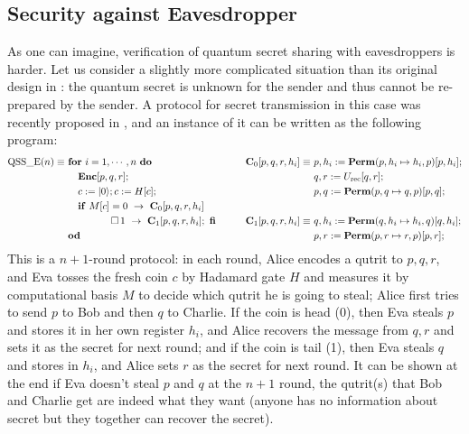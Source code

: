 \documentclass[conference,compsoc, 10pt]{IEEEtran}
\newcommand {\prog } {{\mathbf{C}}}
\def\>{\ensuremath{\rangle}}
\newcommand {\perm} {\mathbf{Perm}}
\begin{document}
\begin{appendices}
		\subsection{Security against Eavesdropper} As one can imagine, verification of quantum secret sharing with eavesdroppers is harder. Let us consider a slightly more complicated situation than its original design in \cite{HBB99,KKI99,CGL99}: the quantum secret is unknown for the sender and thus cannot be re-prepared by the sender. A protocol for secret transmission in this case was recently proposed in \cite{YLZ19}, and an instance of it can be written as the following program:  
		\begin{align*}
		{\rm QSS\_ E}(n) \equiv\ &{\bf for}\ i=1,\cdots, n\ {\bf do} & \prog_0[p,q,r,h_i]\equiv\ & p,h_i := \perm(p,h_i\mapsto h_i,p)[p,h_i];\\
		&\quad {\bf Enc}[p,q,r]; & & q,r := U_{\rm rec}[q,r];\\
		&\quad c:= |0\>; c:= H[c]; & & p,q := \perm(p,q\mapsto q,p)[p,q];\\
		&\quad {\bf if}\ M[c] = 0\ \rightarrow\ \prog_0[p,q,r,h_i] & & \\
		&\quad \qquad\quad\ \square\,  1\ \rightarrow\ \prog_1[p,q,r,h_i];\ {\bf fi} & \qquad\prog_1[p,q,r,h_i]\equiv\ & q,h_i := \perm(q,h_i\mapsto h_i,q)[q,h_i];  \\
		&{\bf od} & & p,r := \perm(p,r\mapsto r,p)[p,r];
		\end{align*}
		This is a $n+1$-round protocol: in each round, Alice encodes a qutrit to $p,q,r$, and Eva tosses the fresh coin $c$ by Hadamard gate $H$ and measures it by computational basis $M$ to decide which qutrit he is going to steal; Alice first tries to send $p$ to Bob and then $q$ to Charlie. If the coin is head (0), then Eva steals $p$ and stores it in her own register $h_i$, and Alice recovers the message from $q,r$ and sets it as the secret for next round; and if the coin is tail (1), then Eva steals $q$ and stores in $h_i$, and Alice sets $r$ as the secret for next round. It can be shown at the end if Eva doesn't steal $p$ and $q$ at the $n+1$ round, the qutrit(s) that Bob and Charlie get are indeed what they want (anyone has no information about secret but they together can recover the secret).
		

\end{appendices}
\end{document}
